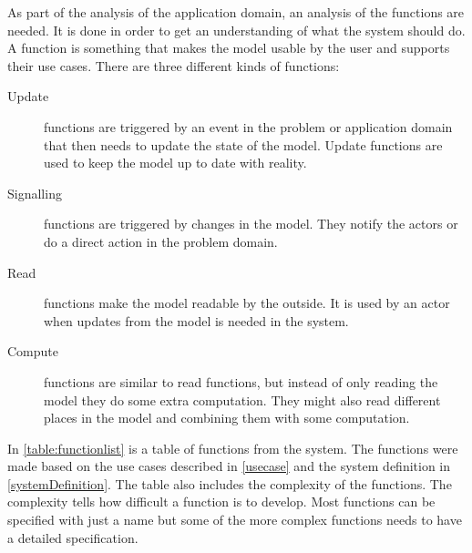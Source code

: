 As part of the analysis of the application domain, an analysis of the functions are needed. It is done in order to get an understanding of what the system should do. A function is something that makes the model usable by the user and supports their use cases. There are three different kinds of functions:

\begin{description}
    \item[Update] functions are triggered by an event in the problem or application domain that then needs to update the state of the model. Update functions are used to keep the model up to date with reality.

    \item[Signalling] functions are triggered by changes in the model. They notify the actors or do a direct action in the problem domain.

    \item[Read] functions make the model readable by the outside. It is used by an actor when updates from the model is needed in the system.

    \item[Compute] functions are similar to read functions, but instead of only reading the model they do some extra computation. They might also read different places in the model and combining them with some computation.
\end{description}

In \cref{table:functionlist} is a table of functions from the system. The functions were made based on the use cases described in \cref{usecase} and the system definition in \cref{systemDefinition}. The table also includes the complexity of the functions. The complexity tells how difficult a function is to develop. Most functions can be specified with just a name but some of the more complex functions needs to have a detailed specification.

